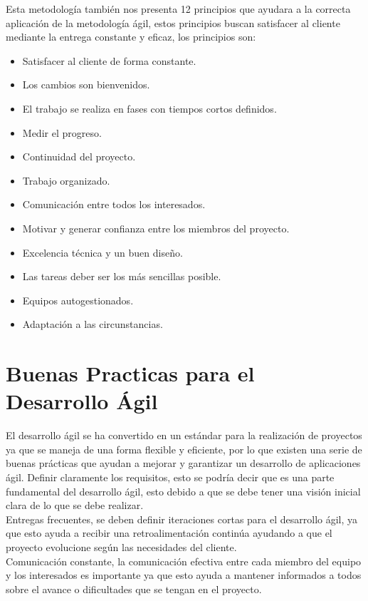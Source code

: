 \documentclass[12pt]{article}
\begin{document}
Esta metodología también  nos presenta 12 principios que ayudara a la correcta aplicación de la metodología ágil, estos principios buscan satisfacer al cliente mediante la entrega constante y eficaz, los principios son:
\begin{itemize}
\item Satisfacer al cliente de forma constante.
\item Los cambios son bienvenidos.
\item El trabajo se realiza en fases con tiempos cortos definidos.
\item Medir el progreso.
\item Continuidad del proyecto.
\item Trabajo organizado.
\item Comunicación entre todos los interesados.
\item Motivar y generar confianza entre los miembros del proyecto.
\item Excelencia técnica y un buen diseño.
\item Las tareas deber ser los más sencillas posible.
\item Equipos autogestionados.
\item Adaptación a las circunstancias.
\end{itemize}

\section*{Buenas Practicas para el Desarrollo Ágil }
El desarrollo ágil se ha convertido en un estándar para la realización de proyectos ya que se maneja de una forma flexible y eficiente, por lo que existen una serie de buenas prácticas que ayudan a mejorar y garantizar un desarrollo de aplicaciones ágil.
Definir claramente los requisitos, esto se podría decir que es una parte fundamental del desarrollo ágil, esto debido a que se debe tener una visión inicial clara de lo que se debe realizar.\\ 

Entregas frecuentes, se deben definir iteraciones cortas para el desarrollo ágil, ya que esto ayuda a recibir una retroalimentación continúa ayudando a que el proyecto evolucione según las necesidades del cliente.\\ 

Comunicación constante, la comunicación efectiva entre cada miembro del equipo y los interesados es importante ya que esto ayuda a mantener informados a todos sobre el avance o dificultades que se tengan en el proyecto.\\ 
\end{document}
